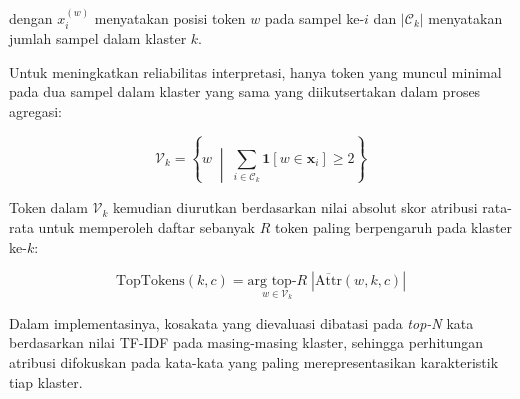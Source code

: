 \noindent dengan $x_i^{(w)}$ menyatakan posisi token $w$ pada sampel ke-$i$
dan $|\mathcal{C}_k|$ menyatakan jumlah sampel dalam klaster $k$.

Untuk meningkatkan reliabilitas interpretasi, hanya token yang muncul minimal
pada dua sampel dalam klaster yang sama yang diikutsertakan dalam proses agregasi:

\begin{equation}
    \mathcal{V}_k = \left\{ w \;\middle|\;
    \sum_{i \in \mathcal{C}_k} \mathbf{1}[w \in \mathbf{x}_i]
    \geq 2 \right\}
    \label{eq:vocab_filter}
\end{equation}

\noindent Token dalam $\mathcal{V}_k$ kemudian diurutkan berdasarkan nilai absolut
skor atribusi rata-rata untuk memperoleh daftar sebanyak $R$ token paling berpengaruh
pada klaster ke-$k$:

\begin{equation}
    \text{TopTokens}(k, c) =
    \underset{w \in \mathcal{V}_k}{\text{arg top-}R} \;
    \left| \overline{\text{Attr}}(w, k, c) \right|
    \label{eq:top_tokens}
\end{equation}

\noindent Dalam implementasinya, kosakata yang dievaluasi dibatasi pada \textit{top-N}
kata berdasarkan nilai TF-IDF pada masing-masing klaster, sehingga perhitungan atribusi
difokuskan pada kata-kata yang paling merepresentasikan karakteristik tiap klaster.